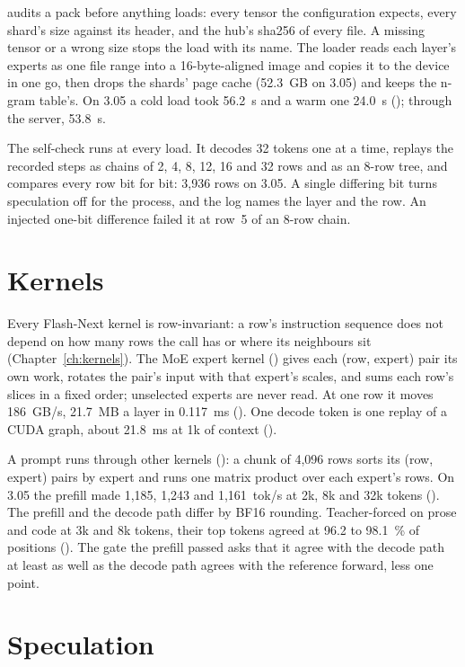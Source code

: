  audits a pack before anything loads: every tensor the configuration expects, every shard's size against its header, and the hub's sha256 of every file. A missing tensor or a wrong size stops the load with its name. The loader reads each layer's experts as one file range into a 16-byte-aligned image and copies it to the device in one go, then drops the shards' page cache (52.3~GB on 3.05) and keeps the n-gram table's. On 3.05 a cold load took 56.2~s and a warm one 24.0~s (\measured); through the server, 53.8~s.

The self-check runs at every load. It decodes 32 tokens one at a time, replays the recorded steps as chains of 2, 4, 8, 12, 16 and 32 rows and as an 8-row tree, and compares every row bit for bit: 3,936 rows on 3.05. A single differing bit turns speculation off for the process, and the log names the layer and the row. An injected one-bit difference failed it at row~5 of an 8-row chain.

\section{Kernels}

Every Flash-Next kernel is row-invariant: a row's instruction sequence does not depend on how many rows the call has or where its neighbours sit (Chapter~\ref{ch:kernels}). The MoE expert kernel () gives each (row, expert) pair its own work, rotates the pair's input with that expert's scales, and sums each row's slices in a fixed order; unselected experts are never read. At one row it moves 186~GB/s, 21.7~MB a layer in 0.117~ms (\measured). One decode token is one replay of a CUDA graph, about 21.8~ms at 1k of context (\measured).

A prompt runs through other kernels (): a chunk of 4,096 rows sorts its (row, expert) pairs by expert and runs one matrix product over each expert's rows. On 3.05 the prefill made 1,185, 1,243 and 1,161~tok/s at 2k, 8k and 32k tokens (\measured). The prefill and the decode path differ by BF16 rounding. Teacher-forced on prose and code at 3k and 8k tokens, their top tokens agreed at 96.2 to 98.1~\% of positions (\measured). The gate the prefill passed asks that it agree with the decode path at least as well as the decode path agrees with the reference forward, less one point.

\section{Speculation}\label{sec:fn-spec}

